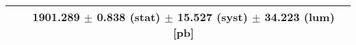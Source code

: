 \begin{tabular}{lc}
\hline
                               & 1901.289 $\pm$ 0.838 (stat) $\pm$ 15.527 (syst) $\pm$ 34.223 (lum) [pb]  \\
\hline
\end{tabular}

